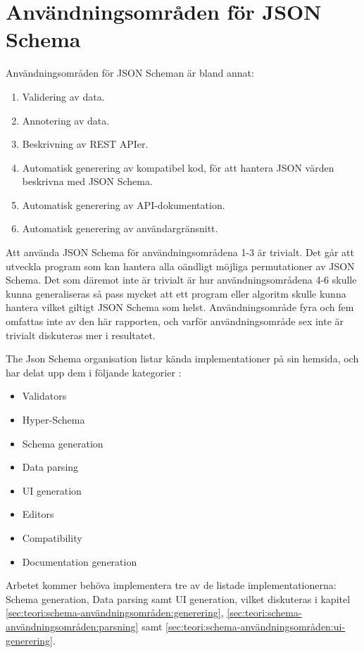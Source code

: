\section{Användningsområden för JSON Schema}
\label{sec:teori:schema-användningsområden}
Användningsområden för JSON Scheman är bland annat:

\begin{enumerate}
	\item Validering av data.
	\item Annotering av data.
	\item Beskrivning av REST APIer.
	\item Automatisk generering av kompatibel kod, för att hantera JSON värden beskrivna med JSON Schema.
	\item Automatisk generering av API-dokumentation.
	\item Automatisk generering av användargränsnitt.
\end{enumerate}

\noindent
Att använda JSON Schema för användningsområdena 1-3 är trivialt. Det går att utveckla program som kan hantera alla oändligt möjliga permutationer av JSON Schema. Det som däremot inte är trivialt är hur användningsområdena 4-6 skulle kunna generaliseras så pass mycket att ett program eller algoritm skulle kunna hantera vilket giltigt JSON Schema som helst. Användningsområde fyra och fem omfattas inte av den här rapporten, och varför användningsområde sex inte är trivialt diskuteras mer i resultatet.

The Json Schema organisation listar kända implementationer på sin hemsida, och har delat upp dem i följande kategorier \cite{TheJSONSchemaorganisation}:
\begin{itemize}
	\item Validators
	\item Hyper-Schema
	\item Schema generation
	\item Data parsing
	\item UI generation
	\item Editors
	\item Compatibility
	\item Documentation generation
\end{itemize}
\noindent
Arbetet kommer behöva implementera tre av de listade implementationerna: Schema generation, Data parsing samt UI generation, vilket diskuteras i kapitel \ref{sec:teori:schema-användningsområden:generering}, \ref{sec:teori:schema-användningsområden:parsning} samt \ref{sec:teori:schema-användningsområden:ui-generering}.

